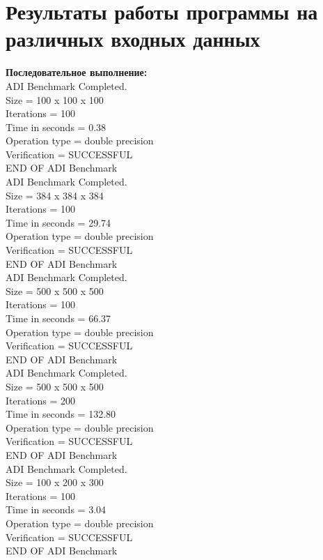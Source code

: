 \documentclass[a4paper,12pt,titlepage,draft]{article}
\begin{document}
\section{Результаты работы программы на различных входных данных}
\begin{minipage}{.5\textwidth}
\textbf{Последовательное выполнение:}\\

 ADI Benchmark Completed.\\
 Size            =  100 x  100 x  100\\
 Iterations      =                100\\
 Time in seconds =               0.38\\
 Operation type  =   double precision\\
 Verification    =         SUCCESSFUL\\
 END OF ADI Benchmark\\
 
 ADI Benchmark Completed.\\
 Size            =  384 x  384 x  384\\
 Iterations      =                100\\
 Time in seconds =              29.74\\
 Operation type  =   double precision\\
 Verification    =         SUCCESSFUL\\
 END OF ADI Benchmark\\

 ADI Benchmark Completed.\\
 Size            =  500 x  500 x  500\\
 Iterations      =                100\\
 Time in seconds =              66.37\\
 Operation type  =   double precision\\
 Verification    =         SUCCESSFUL\\
 END OF ADI Benchmark\\

 ADI Benchmark Completed.\\
 Size            =  500 x  500 x  500\\
 Iterations      =                200\\
 Time in seconds =             132.80\\
 Operation type  =   double precision\\
 Verification    =         SUCCESSFUL\\
 END OF ADI Benchmark\\

 ADI Benchmark Completed.\\
 Size            =  100 x  200 x  300\\
 Iterations      =                100\\
 Time in seconds =               3.04\\
 Operation type  =   double precision\\
 Verification    =         SUCCESSFUL\\
 END OF ADI Benchmark
\end{minipage}
\end{document}
